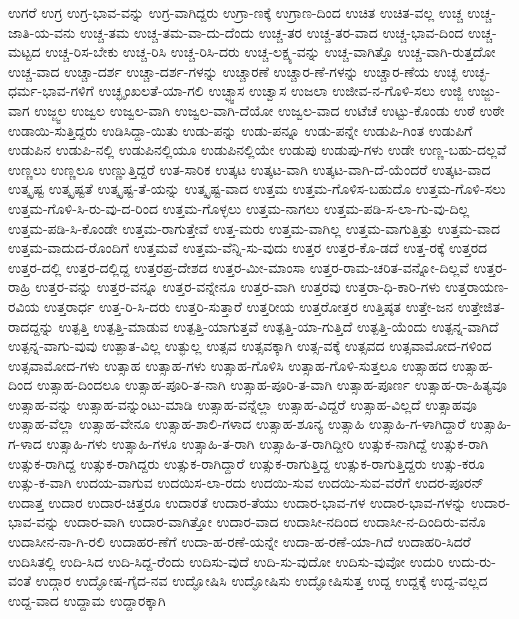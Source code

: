 ಉಗರೆ
ಉಗ್ರ
ಉಗ್ರ-ಭಾವ-ವನ್ನು
ಉಗ್ರ-ವಾಗಿದ್ದರು
ಉಗ್ರಾ-ಣಕ್ಕೆ
ಉಗ್ರಾಣ-ದಿಂದ
ಉಚಿತ
ಉಚಿತ-ವಲ್ಲ
ಉಚ್ಚ
ಉಚ್ಚ-ಜಾತಿ-ಯ-ವನು
ಉಚ್ಚ-ತಮ
ಉಚ್ಚ-ತಮ-ವಾ-ದು-ದೆಂದು
ಉಚ್ಚ-ತರ
ಉಚ್ಚ-ತರ-ವಾದ
ಉಚ್ಚ-ಭಾವ-ದಿಂದ
ಉಚ್ಚ-ಮಟ್ಟದ
ಉಚ್ಚ-ರಿಸ-ಬೇಕು
ಉಚ್ಚ-ರಿಸಿ
ಉಚ್ಚ-ರಿಸಿ-ದರು
ಉಚ್ಚ-ಲಕ್ಷ್ಯ-ವನ್ನು
ಉಚ್ಚ-ವಾಗಿತ್ತೊ
ಉಚ್ಚ-ವಾಗಿ-ರುತ್ತದೋ
ಉಚ್ಚ-ವಾದ
ಉಚ್ಚಾ-ದರ್ಶ
ಉಚ್ಚಾ-ದರ್ಶ-ಗಳನ್ನು
ಉಚ್ಚಾರಣೆ
ಉಚ್ಚಾರ-ಣೆ-ಗಳನ್ನು
ಉಚ್ಚಾರ-ಣೆಯ
ಉಚ್ಛ
ಉಚ್ಛ-ಧರ್ಮ-ಭಾವ-ಗಳಿಗೆ
ಉಚ್ಛೃಂಖಲತೆ-ಯಾ-ಗಲಿ
ಉಚ್ಛ್ವಾಸ
ಉಚ್ವಾಸ
ಉಜಲಾ
ಉಜೀವ-ನ-ಗೊಳಿ-ಸಲು
ಉಜ್ಜಿ
ಉಜ್ಜು-ವಾಗ
ಉಜ್ಜ್ವಲ
ಉಜ್ವಲ
ಉಜ್ವಲ-ವಾಗಿ
ಉಜ್ವಲ-ವಾಗಿ-ದೆಯೋ
ಉಜ್ವಲ-ವಾದ
ಉಟೆಚೆ
ಉಟ್ಟು-ಕೊಂಡು
ಉಠೆ
ಉಠೇ
ಉಡಾಯಿ-ಸುತ್ತಿದ್ದರು
ಉಡಿಸಿದ್ದಾ-ಯಿತು
ಉಡು-ಪನ್ನು
ಉಡು-ಪನ್ನೂ
ಉಡು-ಪನ್ನೇ
ಉಡುಪಿ-ಗಿಂತ
ಉಡುಪಿಗೆ
ಉಡುಪಿನ
ಉಡುಪಿ-ನಲ್ಲಿ
ಉಡುಪಿನಲ್ಲಿಯೂ
ಉಡುಪಿನಲ್ಲಿಯೇ
ಉಡುಪು
ಉಡುಪು-ಗಳು
ಉಡೇ
ಉಣ್ಣ-ಬಹು-ದಲ್ಲವೆ
ಉಣ್ಣಲು
ಉಣ್ಣಲೂ
ಉಣ್ಣುತ್ತಿದ್ದರೆ
ಉತ-ಸಾರಿಕ
ಉತ್ಕಟ
ಉತ್ಕಟ-ವಾಗಿ
ಉತ್ಕಟ-ವಾಗಿ-ದೆ-ಯೆಂದರೆ
ಉತ್ಕಟ-ವಾದ
ಉತ್ಕೃಷ್ಟ
ಉತ್ಕೃಷ್ಟತೆ
ಉತ್ಕೃಷ್ಟ-ತೆ-ಯನ್ನು
ಉತ್ಕೃಷ್ಟ-ವಾದ
ಉತ್ತಮ
ಉತ್ತಮ-ಗೊಳಿಸ-ಬಹುದೊ
ಉತ್ತಮ-ಗೊಳಿ-ಸಲು
ಉತ್ತಮ-ಗೊಳಿ-ಸಿ-ರು-ವು-ದ-ರಿಂದ
ಉತ್ತಮ-ಗೊಳ್ಳಲು
ಉತ್ತಮ-ನಾಗಲು
ಉತ್ತಮ-ಪಡಿ-ಸ-ಲಾ-ಗು-ವು-ದಿಲ್ಲ
ಉತ್ತಮ-ಪಡಿ-ಸಿ-ಕೊಂಡೇ
ಉತ್ತಮ-ರಾಗುತ್ತೇವೆ
ಉತ್ತ-ಮರು
ಉತ್ತಮ-ವಾಗಿಲ್ಲ
ಉತ್ತಮ-ವಾಗುತ್ತಿತ್ತು
ಉತ್ತಮ-ವಾದ
ಉತ್ತಮ-ವಾದುದ-ರೊಂದಿಗೆ
ಉತ್ತಮವೆ
ಉತ್ತಮ-ವೆನ್ನಿ-ಸು-ವುದು
ಉತ್ತರ
ಉತ್ತರ-ಕೊ-ಡದೆ
ಉತ್ತ-ರಕ್ಕೆ
ಉತ್ತರದ
ಉತ್ತರ-ದಲ್ಲಿ
ಉತ್ತರ-ದಲ್ಲಿದ್ದ
ಉತ್ತರಪ್ರ-ದೇಶದ
ಉತ್ತರ-ಮೀ-ಮಾಂಸಾ
ಉತ್ತರ-ರಾಮ-ಚರಿತ-ವನ್ನೋ-ದಿಲ್ಲವೆ
ಉತ್ತರ-ರಾಹ್ರಿ
ಉತ್ತರ-ವನ್ನು
ಉತ್ತರ-ವನ್ನೂ
ಉತ್ತರ-ವನ್ನೇನೂ
ಉತ್ತರ-ವಾಗಿ
ಉತ್ತರವು
ಉತ್ತರಾ-ಧಿ-ಕಾರಿ-ಗಳು
ಉತ್ತರಾಯಣ-ರವಿಯ
ಉತ್ತರಾರ್ಧ
ಉತ್ತ-ರಿ-ಸಿ-ದರು
ಉತ್ತರಿ-ಸುತ್ತಾರೆ
ಉತ್ತರೀಯ
ಉತ್ತರೋತ್ತರ
ಉತ್ತಿಷ್ಠತ
ಉತ್ತೇ-ಜನ
ಉತ್ತೇಜಿತ-ರಾದದ್ದನ್ನು
ಉತ್ಪತ್ತಿ
ಉತ್ಪತ್ತಿ-ಮಾಡುವ
ಉತ್ಪತ್ತಿ-ಯಾಗುತ್ತವೆ
ಉತ್ಪತ್ತಿ-ಯಾ-ಗುತ್ತಿದೆ
ಉತ್ಪತ್ತಿ-ಯೆಂದು
ಉತ್ಪನ್ನ-ವಾಗಿದೆ
ಉತ್ಪನ್ನ-ವಾಗು-ವುವು
ಉತ್ಪಾತ-ವಿಲ್ಲ
ಉತ್ಫುಲ್ಲ
ಉತ್ಸವ
ಉತ್ಸವಕ್ಕಾಗಿ
ಉತ್ಸ-ವಕ್ಕೆ
ಉತ್ಸವದ
ಉತ್ಸವಾಮೋದ-ಗಳಿಂದ
ಉತ್ಸವಾಮೋದ-ಗಳು
ಉತ್ಸಾಹ
ಉತ್ಸಾಹ-ಗಳು
ಉತ್ಸಾಹ-ಗೊಳಿಸಿ
ಉತ್ಸಾಹ-ಗೊಳಿ-ಸುತ್ತಲೂ
ಉತ್ಸಾಹದ
ಉತ್ಸಾಹ-ದಿಂದ
ಉತ್ಸಾಹ-ದಿಂದಲೂ
ಉತ್ಸಾಹ-ಪೂರಿ-ತ-ನಾಗಿ
ಉತ್ಸಾಹ-ಪೂರಿ-ತ-ವಾಗಿ
ಉತ್ಸಾಹ-ಪೂರ್ಣ
ಉತ್ಸಾಹ-ರಾ-ಹಿತ್ಯವೂ
ಉತ್ಸಾಹ-ವನ್ನು
ಉತ್ಸಾಹ-ವನ್ನುಂಟು-ಮಾಡಿ
ಉತ್ಸಾಹ-ವನ್ನೆಲ್ಲಾ
ಉತ್ಸಾಹ-ವಿದ್ದರೆ
ಉತ್ಸಾಹ-ವಿಲ್ಲದೆ
ಉತ್ಸಾಹವೂ
ಉತ್ಸಾಹ-ವೆಲ್ಲಾ
ಉತ್ಸಾಹ-ವೇನೂ
ಉತ್ಸಾಹ-ಶಾಲಿ-ಗಳಾದ
ಉತ್ಸಾಹ-ಶೂನ್ಯ
ಉತ್ಸಾಹಿ
ಉತ್ಸಾಹಿ-ಗ-ಳಾಗಿದ್ದಾರೆ
ಉತ್ಸಾಹಿ-ಗ-ಳಾದ
ಉತ್ಸಾಹಿ-ಗಳು
ಉತ್ಸಾಹಿ-ಗಳೂ
ಉತ್ಸಾಹಿ-ತ-ರಾಗಿ
ಉತ್ಸಾಹಿ-ತ-ರಾಗಿದ್ದೀರಿ
ಉತ್ಸುಕ-ನಾಗಿದ್ದೆ
ಉತ್ಸುಕ-ರಾಗಿ
ಉತ್ಸುಕ-ರಾಗಿದ್ದ
ಉತ್ಸುಕ-ರಾಗಿದ್ದರು
ಉತ್ಸುಕ-ರಾಗಿದ್ದಾರೆ
ಉತ್ಸುಕ-ರಾಗುತ್ತಿದ್ದ
ಉತ್ಸುಕ-ರಾಗುತ್ತಿದ್ದರು
ಉತ್ಸು-ಕರೂ
ಉತ್ಸು-ಕ-ವಾಗಿ
ಉದಯ-ವಾಗುವ
ಉದಯಿಸ-ಲಾ-ರದು
ಉದಯಿ-ಸುವ
ಉದಯಿ-ಸುವ-ವರೆಗೆ
ಉದರ-ಪೂರನ್
ಉದಾತ್ತ
ಉದಾರ
ಉದಾರ-ಚಿತ್ತರೂ
ಉದಾರತೆ
ಉದಾರ-ತೆಯು
ಉದಾರ-ಭಾವ-ಗಳ
ಉದಾರ-ಭಾವ-ಗಳನ್ನು
ಉದಾರ-ಭಾವ-ವನ್ನು
ಉದಾರ-ವಾಗಿ
ಉದಾರ-ವಾಗಿತ್ತೋ
ಉದಾರ-ವಾದ
ಉದಾಸೀ-ನದಿಂದ
ಉದಾಸೀ-ನ-ದಿಂದಿರು-ವನೊ
ಉದಾಸೀನ-ನಾ-ಗಿ-ರಲಿ
ಉದಾಹರ-ಣೆಗೆ
ಉದಾ-ಹ-ರಣೆ-ಯನ್ನೇ
ಉದಾ-ಹ-ರಣೆ-ಯಾ-ಗಿದೆ
ಉದಾಹರಿ-ಸಿದರೆ
ಉದಿಸಿತಲ್ಲಿ
ಉದಿ-ಸಿದ
ಉದಿ-ಸಿದ್ದ-ರೆಂದು
ಉದಿಸು-ವುದೆ
ಉದಿ-ಸು-ವುದೋ
ಉದಿಸು-ವುವೋ
ಉದುರಿ
ಉದು-ರು-ವಂತೆ
ಉದ್ಗಾರ
ಉದ್ಘೋಷ-ಗೈದ-ನವ
ಉದ್ಘೋಷಿಸಿ
ಉದ್ಘೋಷಿಸು
ಉದ್ಘೋಷಿಸುತ್ತ
ಉದ್ದ
ಉದ್ದಕ್ಕೆ
ಉದ್ದ-ವಲ್ಲದ
ಉದ್ದ-ವಾದ
ಉದ್ದಾಮ
ಉದ್ದಾರಕ್ಕಾಗಿ
